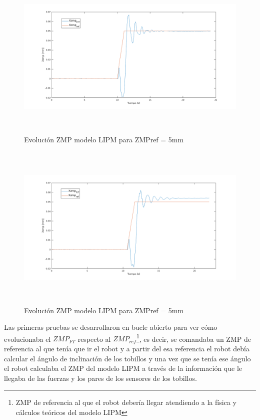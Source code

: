 \begin{figure}[H]
\centering
\includegraphics[width=13cm, height=8cm]{imagenes/apartado_5/5.1/58}
\caption{Evolución ZMP modelo LIPM para ZMPref = 5mm}
\label{figura58}
\end{figure}

\begin{figure}[H]
\centering
\includegraphics[width=13cm, height=8cm]{imagenes/apartado_5/5.1/59}
\caption{Evolución ZMP modelo LIPM para ZMPref = 5mm}
\label{figura59}
\end{figure}



Las primeras pruebas se desarrollaron en bucle abierto para ver cómo evolucionaba el $ZMP_{FT}$ respecto al $ZMP_{ref}$\footnote{ZMP de referencia al que el robot debería llegar atendiendo a la física y cálculos teóricos del modelo LIPM}, es decir, se comandaba un ZMP de referencia al que tenía que ir el robot y a  partir del esa referencia el robot debía calcular el ángulo de inclinación de los tobillos y una vez que se tenía ese ángulo el robot calculaba el ZMP del modelo LIPM a través de la información que le llegaba de las fuerzas y los pares de los sensores de los tobillos.
 
